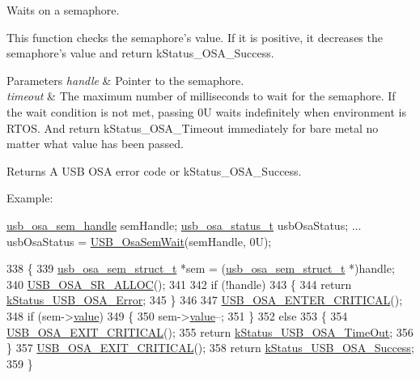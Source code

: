 Waits on a semaphore. 

This function checks the semaphore's value. If it is positive, it decreases the semaphore's value and return k\-Status\-\_\-\-O\-S\-A\-\_\-\-Success.


\begin{DoxyParams}{Parameters}
{\em handle} & Pointer to the semaphore. \\
\hline
{\em timeout} & The maximum number of milliseconds to wait for the semaphore. If the wait condition is not met, passing 0\-U waits indefinitely when environment is R\-T\-O\-S. And return k\-Status\-\_\-\-O\-S\-A\-\_\-\-Timeout immediately for bare metal no matter what value has been passed.\\
\hline
\end{DoxyParams}
\begin{DoxyReturn}{Returns}
A U\-S\-B O\-S\-A error code or k\-Status\-\_\-\-O\-S\-A\-\_\-\-Success.
\end{DoxyReturn}
Example\-: 
\begin{DoxyCode}
\hyperlink{group__usb__os__abstraction_ga9f0e38944e1320d10c45eaacb67185b7}{usb\_osa\_sem\_handle}   semHandle;
\hyperlink{group__usb__os__abstraction_ga8de2fb7579de0a6621bbc1776519b0a9}{usb\_osa\_status\_t}     usbOsaStatus;
...
usbOsaStatus = \hyperlink{group__usb__os__abstraction_gafe9ff8755eb9afadd0ad328ca4fe4c8c}{USB\_OsaSemWait}(semHandle, 0U);
\end{DoxyCode}
 
\begin{DoxyCode}
338 \{
339     \hyperlink{struct__usb__osa__sem__struct}{usb\_osa\_sem\_struct\_t} *sem = (\hyperlink{struct__usb__osa__sem__struct}{usb\_osa\_sem\_struct\_t} *)handle;
340     \hyperlink{usb__osa__bm_8h_a8dbccf46cc2f8e3b5cece6a4a84f7ae8}{USB\_OSA\_SR\_ALLOC}();
341 
342     \textcolor{keywordflow}{if} (!handle)
343     \{
344         \textcolor{keywordflow}{return} \hyperlink{group__usb__os__abstraction_gga453ebd2f93aafb8c938c3a23c815f9bda40b794ea06e27b8ec1d67538f12eb350}{kStatus\_USB\_OSA\_Error};
345     \}
346 
347     \hyperlink{usb__osa__bm_8h_a0485f70bf9c9a22f0340f014bc567362}{USB\_OSA\_ENTER\_CRITICAL}();
348     \textcolor{keywordflow}{if} (sem->\hyperlink{struct__usb__osa__sem__struct_afb12fd6ea4a03d92bcc0caa9f3acf27e}{value})
349     \{
350         sem->\hyperlink{struct__usb__osa__sem__struct_afb12fd6ea4a03d92bcc0caa9f3acf27e}{value}--;
351     \}
352     \textcolor{keywordflow}{else}
353     \{
354         \hyperlink{usb__osa__bm_8h_a5b8053eca19b6df666a26fad3b07f953}{USB\_OSA\_EXIT\_CRITICAL}();
355         \textcolor{keywordflow}{return} \hyperlink{group__usb__os__abstraction_gga453ebd2f93aafb8c938c3a23c815f9bda9ff36cb34c565283214974d1097d08df}{kStatus\_USB\_OSA\_TimeOut};
356     \}
357     \hyperlink{usb__osa__bm_8h_a5b8053eca19b6df666a26fad3b07f953}{USB\_OSA\_EXIT\_CRITICAL}();
358     \textcolor{keywordflow}{return} \hyperlink{group__usb__os__abstraction_gga453ebd2f93aafb8c938c3a23c815f9bdab90805fb75297fda1ca60dbb2283f933}{kStatus\_USB\_OSA\_Success};
359 \}
\end{DoxyCode}
